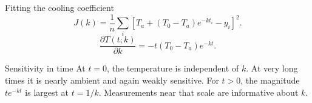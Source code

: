 \documentclass[aspectratio=169,11pt]{beamer}
\newcommand{\notestarget}{notes.pdf}\newcommand{\noteslabel}{Notes}
\begin{document}
\renewcommand{\notestarget}{notes.pdf\#note-fitting-the-cooling-coefficient}
\begin{frame}[t,fragile,label=slide-fitting-the-cooling-coefficient]{Fitting the cooling coefficient}
\[
J(k)=\frac1n\sum_i[T_a+(T_0-T_a)e^{-kt_i}-y_i]^2.
\]
\pause{}
\[
\frac{\partial T(t;k)}{\partial k}=-t(T_0-T_a)e^{-kt}.
\]
\end{frame}
\renewcommand{\notestarget}{notes.pdf\#note-fitting-the-cooling-coefficient}
\begin{frame}[t,fragile,label=slide-sensitivity-in-time]{Sensitivity in time}
At $t=0$, the temperature is independent of $k$. At very long times it is nearly ambient and again weakly sensitive.
\pause{}
For $t>0$, the magnitude $te^{-kt}$ is largest at $t=1/k$. Measurements near that scale are informative about $k$.
\end{frame}
\end{document}
